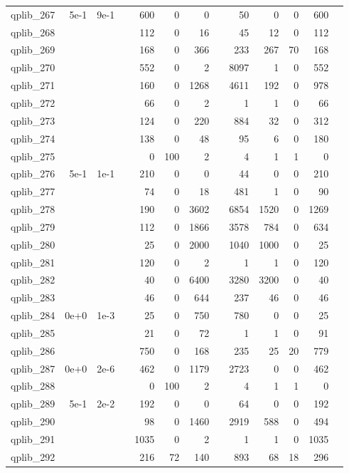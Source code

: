 \begin{table}
\begin{tabular}{lrrrrrrrrrrrr}
qplib\_267	&	5e-1	&	9e-1	&	&	600	&	0	&	0	&	&	50	&	0	&	0	&	600	\\
qplib\_268	&		&		&	&	112	&	0	&	16	&	&	45	&	12	&	0	&	112	\\
qplib\_269	&		&		&	&	168	&	0	&	366	&	&	233	&	267	&	70	&	168	\\
qplib\_270	&		&		&	&	552	&	0	&	2	&	&	8097	&	1	&	0	&	552	\\
qplib\_271	&		&		&	&	160	&	0	&	1268	&	&	4611	&	192	&	0	&	978	\\
qplib\_272	&		&		&	&	66	&	0	&	2	&	&	1	&	1	&	0	&	66	\\
qplib\_273	&		&		&	&	124	&	0	&	220	&	&	884	&	32	&	0	&	312	\\
qplib\_274	&		&		&	&	138	&	0	&	48	&	&	95	&	6	&	0	&	180	\\
qplib\_275	&		&		&	&	0	&	100	&	2	&	&	4	&	1	&	1	&	0	\\
qplib\_276	&	5e-1	&	1e-1	&	&	210	&	0	&	0	&	&	44	&	0	&	0	&	210	\\
qplib\_277	&		&		&	&	74	&	0	&	18	&	&	481	&	1	&	0	&	90	\\
qplib\_278	&		&		&	&	190	&	0	&	3602	&	&	6854	&	1520	&	0	&	1269	\\
qplib\_279	&		&		&	&	112	&	0	&	1866	&	&	3578	&	784	&	0	&	634	\\
qplib\_280	&		&		&	&	25	&	0	&	2000	&	&	1040	&	1000	&	0	&	25	\\
qplib\_281	&		&		&	&	120	&	0	&	2	&	&	1	&	1	&	0	&	120	\\
qplib\_282	&		&		&	&	40	&	0	&	6400	&	&	3280	&	3200	&	0	&	40	\\
qplib\_283	&		&		&	&	46	&	0	&	644	&	&	237	&	46	&	0	&	46	\\
qplib\_284	&	0e+0	&	1e-3	&	&	25	&	0	&	750	&	&	780	&	0	&	0	&	25	\\
qplib\_285	&		&		&	&	21	&	0	&	72	&	&	1	&	1	&	0	&	91	\\
qplib\_286	&		&		&	&	750	&	0	&	168	&	&	235	&	25	&	20	&	779	\\
qplib\_287	&	0e+0	&	2e-6	&	&	462	&	0	&	1179	&	&	2723	&	0	&	0	&	462	\\
qplib\_288	&		&		&	&	0	&	100	&	2	&	&	4	&	1	&	1	&	0	\\
qplib\_289	&	5e-1	&	2e-2	&	&	192	&	0	&	0	&	&	64	&	0	&	0	&	192	\\
qplib\_290	&		&		&	&	98	&	0	&	1460	&	&	2919	&	588	&	0	&	494	\\
qplib\_291	&		&		&	&	1035	&	0	&	2	&	&	1	&	1	&	0	&	1035	\\
qplib\_292	&		&		&	&	216	&	72	&	140	&	&	893	&	68	&	18	&	296	\\

\end{tabular}
\end{table}
